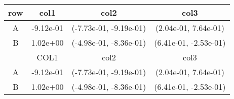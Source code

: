 \begin{tabular}{cccc}
\toprule
row&col1&col2&col3\tabularnewline
\midrule
A&-9.12e-01& (-7.73e-01, -9.19e-01)& (2.04e-01, 7.64e-01)\tabularnewline
B&1.02e+00& (-4.98e-01, -8.36e-01)& (6.41e-01, -2.53e-01)\tabularnewline
\midrule
&COL1&col2&col3\tabularnewline
\midrule
A&-9.12e-01& (-7.73e-01, -9.19e-01)& (2.04e-01, 7.64e-01)\tabularnewline
B&1.02e+00& (-4.98e-01, -8.36e-01)& (6.41e-01, -2.53e-01)\tabularnewline
\bottomrule
\end{tabular}
